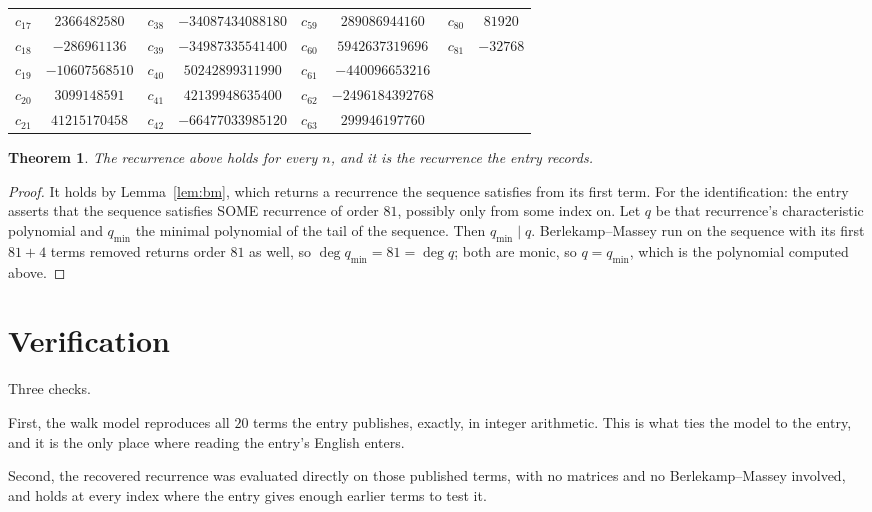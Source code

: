 \documentclass[11pt,a4paper]{article}
\theoremstyle{plain}
\newtheorem{theorem}{Theorem}
\theoremstyle{definition}
\begin{document}
\begin{center}
\begin{tabular}{cccccccc}
$c_{17}$ & $2366482580$ & $c_{38}$ & $-34087434088180$ & $c_{59}$ & $289086944160$ & $c_{80}$ & $81920$ \\
$c_{18}$ & $-286961136$ & $c_{39}$ & $-34987335541400$ & $c_{60}$ & $5942637319696$ & $c_{81}$ & $-32768$ \\
$c_{19}$ & $-10607568510$ & $c_{40}$ & $50242899311990$ & $c_{61}$ & $-440096653216$ &  &  \\
$c_{20}$ & $3099148591$ & $c_{41}$ & $42139948635400$ & $c_{62}$ & $-2496184392768$ &  &  \\
$c_{21}$ & $41215170458$ & $c_{42}$ & $-66477033985120$ & $c_{63}$ & $299946197760$ &  &  \\
\end{tabular}
\end{center}

\begin{theorem}
The recurrence above holds for every $n$, and it is the recurrence the entry records.
\end{theorem}

\begin{proof}
It holds by Lemma~\ref{lem:bm}, which returns a recurrence the sequence satisfies from its
first term. For the identification: the entry asserts that the sequence satisfies SOME
recurrence of order $81$, possibly only from some index on. Let $q$ be that recurrence's
characteristic polynomial and $q_{\min}$ the minimal polynomial of the tail of the sequence.
Then $q_{\min}\mid q$. Berlekamp--Massey run on the sequence with its first $81+4$ terms
removed returns order $81$ as well, so $\deg q_{\min}=81=\deg q$; both are monic, so
$q=q_{\min}$, which is the polynomial computed above.
\end{proof}

\section{Verification}

Three checks.

First, the walk model reproduces all $20$ terms the entry publishes, exactly, in integer
arithmetic. This is what ties the model to the entry, and it is the only place where reading
the entry's English enters.

Second, the recovered recurrence was evaluated directly on those published terms, with no
matrices and no Berlekamp--Massey involved, and holds at every index where the entry gives
enough earlier terms to test it.
\end{document}
